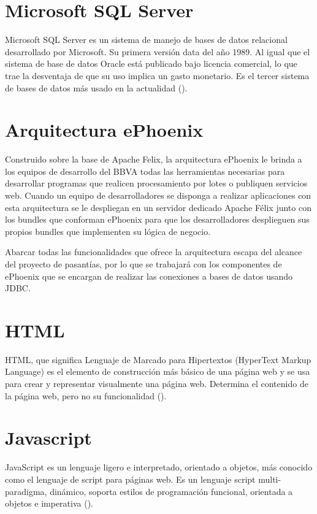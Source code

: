\section{Microsoft SQL Server}
Microsoft SQL Server es un sistema de manejo de bases de datos relacional desarrollado por
Microsoft. Su primera versión data del año 1989. Al igual que el sistema de base de datos
Oracle está publicado bajo licencia comercial, lo que trae la desventaja de que su uso
implica un gasto monetario. Es el tercer sistema de bases de datos más usado en la actualidad
(\cite{POPULARITY}).

\section{Arquitectura ePhoenix}

Construido sobre la base de Apache Felix, la arquitectura ePhoenix le brinda a los
equipos de desarrollo del BBVA todas las herramientas necesarias para desarrollar programas
que realicen procesamiento por lotes o publiquen servicios web. Cuando un equipo de
desarrolladores se disponga a realizar aplicaciones con esta arquitectura se le despliegan
en un servidor dedicado Apache Félix junto con los bundles que conforman ePhoenix para
que los desarrolladores desplieguen sus propios bundles que implementen su lógica de negocio.

Abarcar todas las funcionalidades que ofrece la arquitectura escapa del alcance del
proyecto de pasantías, por lo que se trabajará con los componentes de ePhoenix
que se encargan de realizar las conexiones a bases de datos usando JDBC.

\section{HTML}

HTML, que significa Lenguaje de Marcado para Hipertextos (HyperText Markup Language)
es el elemento de construcción más básico de una página web y se usa para crear y
representar visualmente una página web. Determina el contenido de la página web,
pero no su funcionalidad (\cite{HTML}).

\section{Javascript}

JavaScript es un lenguaje ligero e interpretado, orientado a objetos, más conocido
como el lenguaje de script para páginas web. Es un lenguaje script multi-paradigma, dinámico,
soporta estilos de programación funcional, orientada a objetos e imperativa (\cite{JS}).

